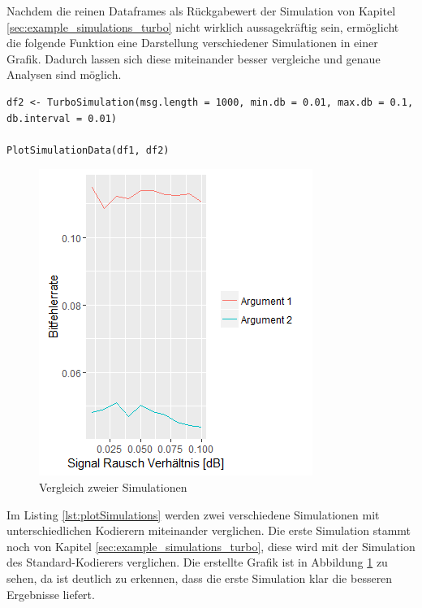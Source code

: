 Nachdem die reinen Dataframes als Rückgabewert der Simulation von Kapitel \ref{sec:example_simulations_turbo} nicht wirklich aussagekräftig sein, ermöglicht die folgende Funktion eine Darstellung verschiedener Simulationen in einer Grafik. Dadurch lassen sich diese miteinander besser vergleiche und genaue Analysen sind möglich.

\begin{lstlisting}[caption=Vergleich mehrerer Simulationen, label={lst:plotSimulations}, float=!ht]
df2 <- TurboSimulation(msg.length = 1000, min.db = 0.01, max.db = 0.1, db.interval = 0.01)

PlotSimulationData(df1, df2)
\end{lstlisting}

\begin{figure}[ht]
\centering
\includegraphics[width=\ScaleIfNeeded]{pictures/PlotSimulations}
\caption{Vergleich zweier Simulationen}
\label{pic:plotSimulations}
\end{figure}

Im Listing \ref{lst:plotSimulations} werden zwei verschiedene Simulationen mit unterschiedlichen Kodierern miteinander verglichen. Die erste Simulation stammt noch von Kapitel \ref{sec:example_simulations_turbo}, diese wird mit der Simulation des Standard-Kodierers verglichen. Die erstellte Grafik ist in Abbildung \ref{pic:plotSimulations} zu sehen, da ist deutlich zu erkennen, dass die erste Simulation klar die besseren Ergebnisse liefert.